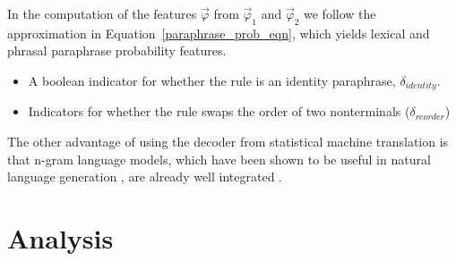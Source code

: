 \documentclass[11pt]{article}
\begin{document}
In the computation of the features $\vec{\varphi}$ from
$\vec{\varphi}_1$ and $\vec{\varphi}_2$ we follow the approximation in
Equation~\ref{paraphrase_prob_eqn}, which yields lexical and phrasal
paraphrase probability features.


\begin{itemize}
\item A boolean indicator for whether the rule is an identity
  paraphrase, $\delta_{\mathit{identity}}$.
  \item Indicators for whether the rule swaps the order of two
  nonterminals ($\delta_{\mathit{reorder}}$) 
\end{itemize}

The other advantage of using the decoder from statistical machine translation is that n-gram language models, which have been shown to be useful in natural language generation \cite{Langkilde1998}, are already well integrated \cite{}.








\section{Analysis} \label{analysis}
\end{document}
